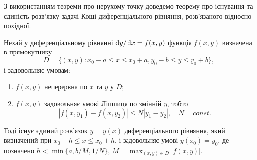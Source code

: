З використанням теореми про нерухому точку доведемо теорему про існування та єдиність розв'язку задачі Коші диференціального рівняння, розв'язаного відносно похідної.

\begin{theorem}
	Нехай у диференціальному рівнянні $\mathop{}\!\mathrm{d} y / \mathop{}\!\mathrm{d} x = f(x, y)$ функція $f(x,y)$ визначена в прямокутнику
	\begin{equation*}
		D = \{(x,y) : x_0 - a \le x \le x_0 + a, y_0 - b \le y \le y_0 + b\},
	\end{equation*}
	і задовольняє умовам:
	\begin{enumerate}
		\item $f(x,y)$ неперервна по $x$ та $y$ у $D$;
		\item $f(x,y)$ задовольняє умові Ліпшиця по змінній $y$, тобто 
		\begin{equation*}
			|f(x, y_1) - f(x, y_2)| \le N |y_1 - y_2|, \quad N = const.
		\end{equation*}
	\end{enumerate}

	Тоді існує єдиний розв'язок $y = y(x)$ диференціального рівняння, який визначений при $x_0 - h \le x \le x_0 + h$, і задовольняє умові $y(x_0) = y_0$, де позначено $h < \min \{a, b / M, 1 / N\}$, $M = \max_{(x, y) \in D} |f(x,y)|$.
\end{theorem}

